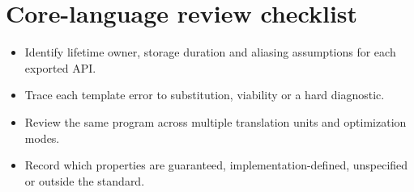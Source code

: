 \documentclass[11pt]{article}
\begin{document}
\section{Core-language review checklist}
\begin{itemize}[leftmargin=*,itemsep=1pt,topsep=3pt]
\item Identify lifetime owner, storage duration and aliasing assumptions for each exported API.
\item Trace each template error to substitution, viability or a hard diagnostic.
\item Review the same program across multiple translation units and optimization modes.
\item Record which properties are guaranteed, implementation-defined, unspecified or outside the standard.
\end{itemize}
\docend
\end{document}
